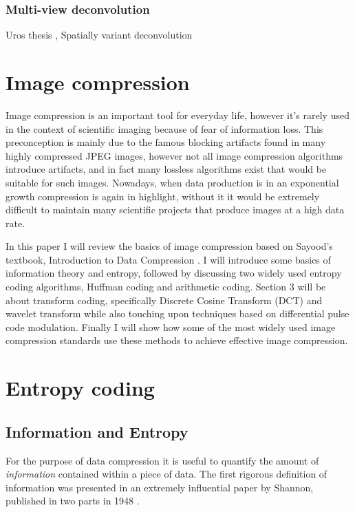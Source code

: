 \documentclass{diploma_style}
\begin{document}
        \subsubsection{Multi-view deconvolution}
        
        \cite{krzic_multiple-view_2009} Uros thesis
        \cite{temerinac-ott_multiview_2012}, \cite{temerinac-ott_spatially-variant_2011} Spatially variant deconvolution
        
        
\section{Image compression}
Image compression is an important tool for everyday life, however it's rarely used in the context of scientific imaging because of fear of information loss. This preconception is mainly due to the famous blocking artifacts found in many highly compressed JPEG images, however not all image compression algorithms introduce artifacts, and in fact many lossless algorithms exist that would be suitable for such images. Nowadays, when data production is in an exponential growth compression is again in highlight, without it it would be extremely difficult to maintain many scientific projects that produce images at a high data rate. 

In this paper I will review the basics of image compression based on Sayood's textbook, Introduction to Data Compression \cite{sayood_introduction_2012}. 
I will introduce some basics of information theory and entropy, followed by discussing two widely used entropy coding algorithms, Huffman coding and arithmetic coding. Section 3 will be about transform coding, specifically Discrete Cosine Transform (DCT) and wavelet transform while also touching upon techniques based on differential pulse code modulation. Finally I will show how some of the most widely used image compression standards use these methods to achieve effective image compression.

\section{Entropy coding}
\subsection{Information and Entropy}
For the purpose of data compression it is useful to quantify the amount of \textit{information} contained within a piece of data. The first rigorous definition of information was presented in an extremely influential paper by Shannon, published in two parts in 1948 \cite{shannon_mathematical_1948, shannon_mathematical_1948-1}.
\end{document}
